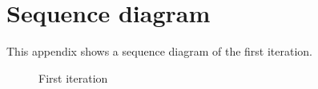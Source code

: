 \chapter{Sequence diagram} \label{app:sequence-diagram}
This appendix shows a sequence diagram of the first iteration.

\begin{figure}[H]
     \caption{\label{fig:sequence-diagram-appendix} First iteration }
\end{figure}